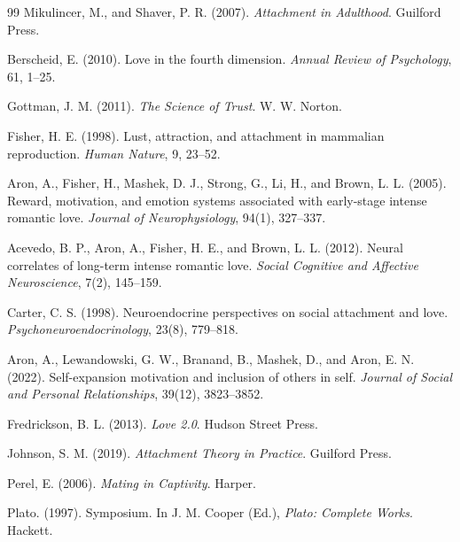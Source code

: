 \documentclass[11pt]{article}
\begin{document}
\begin{thebibliography}{99}
Mikulincer, M., and Shaver, P. R. (2007).
\newblock \emph{Attachment in Adulthood}.
\newblock Guilford Press.

Berscheid, E. (2010).
\newblock Love in the fourth dimension.
\newblock \emph{Annual Review of Psychology}, 61, 1--25.

Gottman, J. M. (2011).
\newblock \emph{The Science of Trust}.
\newblock W. W. Norton.

Fisher, H. E. (1998).
\newblock Lust, attraction, and attachment in mammalian reproduction.
\newblock \emph{Human Nature}, 9, 23--52.

Aron, A., Fisher, H., Mashek, D. J., Strong, G., Li, H., and Brown, L. L. (2005).
\newblock Reward, motivation, and emotion systems associated with early-stage intense romantic love.
\newblock \emph{Journal of Neurophysiology}, 94(1), 327--337.

Acevedo, B. P., Aron, A., Fisher, H. E., and Brown, L. L. (2012).
\newblock Neural correlates of long-term intense romantic love.
\newblock \emph{Social Cognitive and Affective Neuroscience}, 7(2), 145--159.

Carter, C. S. (1998).
\newblock Neuroendocrine perspectives on social attachment and love.
\newblock \emph{Psychoneuroendocrinology}, 23(8), 779--818.

Aron, A., Lewandowski, G. W., Branand, B., Mashek, D., and Aron, E. N. (2022).
\newblock Self-expansion motivation and inclusion of others in self.
\newblock \emph{Journal of Social and Personal Relationships}, 39(12), 3823--3852.

Fredrickson, B. L. (2013).
\newblock \emph{Love 2.0}.
\newblock Hudson Street Press.

Johnson, S. M. (2019).
\newblock \emph{Attachment Theory in Practice}.
\newblock Guilford Press.

Perel, E. (2006).
\newblock \emph{Mating in Captivity}.
\newblock Harper.

Plato. (1997).
\newblock Symposium.
\newblock In J. M. Cooper (Ed.), \emph{Plato: Complete Works}. Hackett.


\end{thebibliography}
\end{document}
